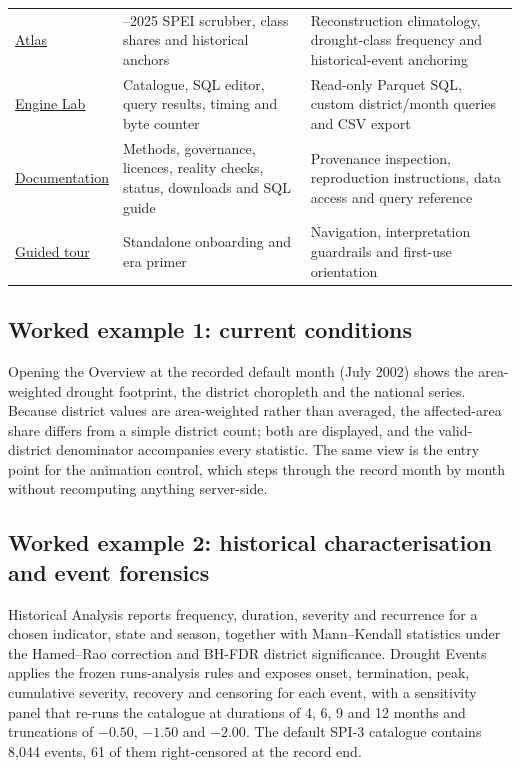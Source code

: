 \documentclass[10pt,a4paper]{article}
\begin{document}
\begin{table}[t]
\begin{tabularx}{\textwidth}{@{}>{\RaggedRight\arraybackslash}p{}>{\RaggedRight\arraybackslash}p{}>{\RaggedRight\arraybackslash}X@{}}
\href{https://drought.ankitdeshmukh.com/\#atlas}{Atlas} & 1901--2025 SPEI scrubber, class shares and historical anchors & Reconstruction climatology, drought-class frequency and historical-event anchoring \\
\href{https://drought.ankitdeshmukh.com/\#engine}{Engine Lab} & Catalogue, SQL editor, query results, timing and byte counter & Read-only Parquet SQL, custom district/month queries and CSV export \\
\href{https://drought.ankitdeshmukh.com/\#data}{Documentation} & Methods, governance, licences, reality checks, status, downloads and SQL guide & Provenance inspection, reproduction instructions, data access and query reference \\
\href{https://drought.ankitdeshmukh.com/tour.html}{Guided tour} & Standalone onboarding and era primer & Navigation, interpretation guardrails and first-use orientation \\
\bottomrule
\end{tabularx}
\end{table}

\subsection*{Worked example 1: current conditions}
Opening the Overview at the recorded default month (July 2002) shows the area-weighted drought footprint, the district choropleth and the national series. Because district values are area-weighted rather than averaged, the affected-area share differs from a simple district count; both are displayed, and the valid-district denominator accompanies every statistic. The same view is the entry point for the animation control, which steps through the record month by month without recomputing anything server-side.

\subsection*{Worked example 2: historical characterisation and event forensics}
Historical Analysis reports frequency, duration, severity and recurrence for a chosen indicator, state and season, together with Mann--Kendall statistics under the Hamed--Rao correction and BH-FDR district significance. Drought Events applies the frozen runs-analysis rules and exposes onset, termination, peak, cumulative severity, recovery and censoring for each event, with a sensitivity panel that re-runs the catalogue at durations of 4, 6, 9 and 12 months and truncations of $-0.50$, $-1.50$ and $-2.00$. The default SPI-3 catalogue contains 8,044 events, 61 of them right-censored at the record end.
\end{document}
